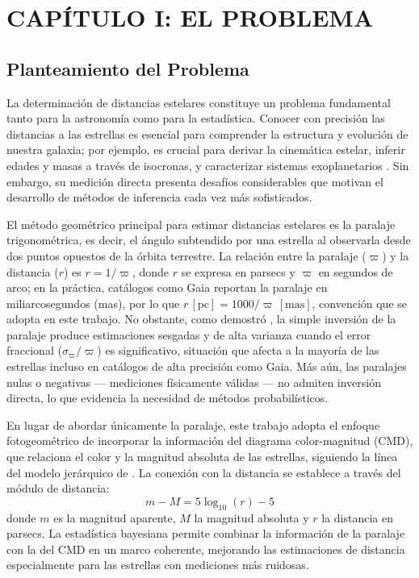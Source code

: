 \documentclass[stu, 12pt, letterpaper, donotrepeattitle, floatsintext, natbib]{apa7_ula}
\begin{document}
\renewcommand{\listtablename}{\large{Índice de Tablas}}
\listoftables
\newpage


\section{CAPÍTULO I: EL PROBLEMA}

\subsection{Planteamiento del Problema}

\justifying \parindent=1.5cm

La determinación de distancias estelares constituye un problema
fundamental tanto para la astronomía como para la estadística.
Conocer con precisión las distancias a las estrellas es esencial
para comprender la estructura y evolución de nuestra galaxia;
por ejemplo, es crucial para derivar la cinemática estelar,
inferir edades y masas a través de isocronas, y caracterizar sistemas
exoplanetarios \citep{luri2018gaia,Vallenari2022GaiaDR}. Sin embargo,
su medición directa presenta desafíos considerables
que motivan el desarrollo de métodos de inferencia cada vez más
sofisticados.

El método geométrico principal para estimar distancias estelares
es la paralaje trigonométrica, es decir, el ángulo subtendido por una estrella
al observarla desde dos puntos opuestos de la órbita terrestre.
La relación entre la paralaje ($\varpi$) y la distancia ($r$) es
$r = 1/\varpi$, donde $r$ se expresa en parsecs y $\varpi$ en
segundos de arco; en la práctica, catálogos como Gaia reportan la
paralaje en miliarcosegundos (mas), por lo que $r\,[\mathrm{pc}] =
1000/\varpi\,[\mathrm{mas}]$, convención que se adopta en este
trabajo. No obstante, como demostró \citet{Bailer_2015},
la simple inversión de la paralaje produce estimaciones sesgadas
y de alta varianza cuando el error fraccional ($\sigma_\varpi / \varpi$)
es significativo, situación que afecta a la mayoría de las estrellas
incluso en catálogos de alta precisión como Gaia. Más aún, las
paralajes nulas o negativas --- mediciones físicamente válidas ---
no admiten inversión directa, lo que evidencia la necesidad de
métodos probabilísticos.

En lugar de abordar únicamente la paralaje, este trabajo adopta el
enfoque fotogeométrico de incorporar la información del diagrama
color-magnitud (CMD), que
relaciona el color y la magnitud absoluta de las estrellas, siguiendo
la línea del modelo jerárquico de \citet{Leistedt_2017}. La
conexión con la distancia se establece a través del módulo de
distancia:
\begin{equation}
    m - M = 5\log_{10}(r) - 5
\end{equation}
donde $m$ es la magnitud aparente, $M$ la magnitud absoluta y $r$
la distancia en parsecs. La estadística bayesiana permite combinar
la información de la paralaje con la del CMD en un marco coherente,
mejorando las estimaciones de distancia especialmente para las
estrellas con mediciones más ruidosas.
\end{document}
